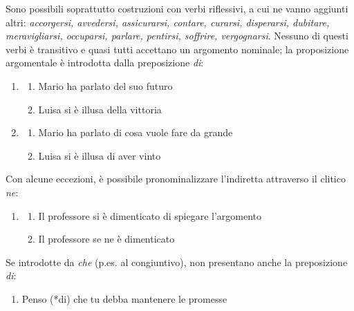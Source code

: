 \documentclass[
  a4paper,
  twoside,
  11pt,
  chapterprefix=false,
  bibliography=totocnumbered,
  listof=flat]{scrbook}
\providecommand{\tightlist}{%
  \setlength{\itemsep}{0pt}\setlength{\parskip}{0pt}}
\begin{document}
Sono possibili soprattutto costruzioni con verbi riflessivi, a cui ne vanno aggiunti altri: \emph{accorgersi, avvedersi, assicurarsi, contare, curarsi, disperarsi, dubitare, meravigliarsi, occuparsi, parlare, pentirsi, soffrire, vergognarsi}. Nessuno di questi verbi è transitivo e quasi tutti accettano un argomento nominale; la proposizione argomentale è introdotta dalla preposizione \emph{di}:

\begin{enumerate}
\def\labelenumi{(\arabic{enumi})}
\setcounter{enumi}{63}
\item
  \begin{enumerate}
  \def\labelenumii{\alph{enumii}.}
  \tightlist
  \item
    Mario ha parlato del suo futuro
  \item
    Luisa si è illusa della vittoria
  \end{enumerate}
\item
  \begin{enumerate}
  \def\labelenumii{\alph{enumii}.}
  \tightlist
  \item
    Mario ha parlato di cosa vuole fare da grande
  \item
    Luisa si è illusa di aver vinto
  \end{enumerate}
\end{enumerate}

Con alcune eccezioni, è possibile pronominalizzare l'indiretta attraverso il clitico \emph{ne}:

\begin{enumerate}
\def\labelenumi{(\arabic{enumi})}
\setcounter{enumi}{65}
\item
  \begin{enumerate}
  \def\labelenumii{\alph{enumii}.}
  \tightlist
  \item
    Il professore si è dimenticato di spiegare l'argomento
  \item
    Il professore se ne è dimenticato
  \end{enumerate}
\end{enumerate}

Se introdotte da \emph{che} (p.es. al congiuntivo), non presentano anche la preposizione \emph{di}:

\begin{enumerate}
\def\labelenumi{(\arabic{enumi})}
\setcounter{enumi}{66}
\tightlist
\item
  Penso (*di) che tu debba mantenere le promesse
\end{enumerate}
\end{document}

